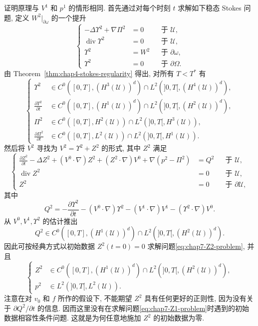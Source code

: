 \begin{sloppypar}
\begin{Proof}
证明原理与 $V^1$ 和 $p^1$ 的情形相同. 首先通过对每个时刻 $t$ 求解如下稳态 Stokes 问题, 定义 $W^2|_{\partial\omega}$ 的一个提升
\[
\left\{
\begin{aligned}
 -\Delta\Upsilon^2+\nabla\Pi^2&=0&&\text{于 }\mathcal U,\\
 \operatorname{div}\Upsilon^2&=0&&\text{于 }\mathcal U,\\
 \Upsilon^2&=W^2&&\text{于 }\partial\omega,\\
 \Upsilon^2&=0&&\text{于 }\partial\Omega.
\end{aligned}
\right.
\]
由 Theorem~\ref{thm:chap4-stokes-regularity} 得出, 对所有 $T<T^*$ 有
\[
\left\{
\begin{aligned}
 \Upsilon^2&\in C^0([0,T],(H^3(\mathcal U))^d)\cap L^2(]0,T[,(H^4(\mathcal U))^d),\\
 \frac{\partial\Upsilon^2}{\partial t}&\in C^0([0,T],(H^1(\mathcal U))^d)\cap L^2(]0,T[,(H^2(\mathcal U))^d),\\
 \Pi^2&\in C^0([0,T],H^2(\mathcal U))\cap L^2(]0,T[,H^3(\mathcal U)),\\
 \frac{\partial\Pi^2}{\partial t}&\in C^0([0,T],L^2(\mathcal U))\cap L^2(]0,T[,H^1(\mathcal U)).
\end{aligned}
\right.
\]
然后将 $V^2$ 寻找为 $V^2=\Upsilon^2+Z^2$ 的形式, 其中 $Z^2$ 满足
\begin{equation}
\left\{
\begin{aligned}
 \frac{\partial Z^2}{\partial t}-\Delta Z^2+(V^0\cdot\nabla)Z^2
 +(Z^2\cdot\nabla)V^0+\nabla(p^2-\Pi^2)&=Q^2&&\text{于 }\mathcal U,\\
 \operatorname{div}Z^2&=0&&\text{于 }\mathcal U,\\
 Z^2&=0&&\text{于 }\partial\mathcal U,
\end{aligned}
\right.
\label{eq:chap7-Z2-problem}
\end{equation}
其中
\[
 Q^2=-\frac{\partial\Upsilon^2}{\partial t}-(V^0\cdot\nabla)\Upsilon^2
 -(V^1\cdot\nabla)V^1-(\Upsilon^2\cdot\nabla)V^0.
\]
从 $V^0,V^1,\Upsilon^2$ 的估计推出
\[
 Q^2\in C^0([0,T],(H^1(\mathcal U))^d)\cap L^2(]0,T[,(H^2(\mathcal U))^d).
\]
因此可按经典方式以初始数据 $Z^2(t=0)=0$ 求解问题\eqref{eq:chap7-Z2-problem}, 并且
\[
\left\{
\begin{aligned}
 Z^2&\in C^0([0,T],(H^1(\mathcal U))^d)\cap L^2(]0,T[,(H^2(\mathcal U))^d),\\
 p^2&\in L^2(]0,T[,L^2(\mathcal U)).
\end{aligned}
\right.
\]
注意在对 $v_0$ 和 $f$ 所作的假设下, 不能期望 $Z^2$ 具有任何更好的正则性, 因为没有关于 $\partial Q^2/\partial t$ 的信息. 因而这里没有在求解问题\eqref{eq:chap7-Z1-problem}时遇到的初始数据相容性条件问题. 这就是为何任意地施加 $Z^2$ 的初始数据为零.
\end{Proof}


\end{sloppypar}
